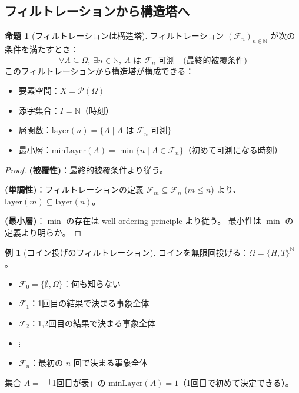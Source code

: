 \documentclass[a4paper,12pt]{ltjsarticle}
\theoremstyle{definition}
\newtheorem{proposition}[definition]{命題}
\newtheorem{example}[definition]{例}
\begin{document}
\subsection{フィルトレーションから構造塔へ}

\begin{proposition}[フィルトレーションは構造塔]\label{prop:filtration-to-tower}
フィルトレーション $(\mathcal{F}_n)_{n \in \mathbb{N}}$ が次の条件を満たすとき：
\[
  \forall A \subseteq \Omega,\ \exists n \in \mathbb{N},\ A \text{ は } \mathcal{F}_n\text{-可測}
  \quad \text{(最終的被覆条件)}
\]
このフィルトレーションから構造塔が構成できる：
\begin{itemize}
  \item 要素空間：$X = \mathcal{P}(\Omega)$
  \item 添字集合：$I = \mathbb{N}$（時刻）
  \item 層関数：$\mathrm{layer}(n) = \{ A \mid A \text{ は } \mathcal{F}_n\text{-可測}\}$
  \item 最小層：$\mathrm{minLayer}(A) = \min\{ n \mid A \in \mathcal{F}_n \}$（初めて可測になる時刻）
\end{itemize}
\end{proposition}

\begin{proof}
\textbf{(被覆性)}：最終的被覆条件より従う。

\textbf{(単調性)}：フィルトレーションの定義 $\mathcal{F}_m \subseteq \mathcal{F}_n$ ($m \leq n$) より、
$\mathrm{layer}(m) \subseteq \mathrm{layer}(n)$。

\textbf{(最小層)}：$\min$ の存在は well-ordering principle より従う。
最小性は $\min$ の定義より明らか。
\end{proof}

\begin{example}[コイン投げのフィルトレーション]
コインを無限回投げる：$\Omega = \{H, T\}^\mathbb{N}$。
\begin{itemize}
  \item $\mathcal{F}_0 = \{\emptyset, \Omega\}$：何も知らない
  \item $\mathcal{F}_1$：1回目の結果で決まる事象全体
  \item $\mathcal{F}_2$：1,2回目の結果で決まる事象全体
  \item $\vdots$
  \item $\mathcal{F}_n$：最初の $n$ 回で決まる事象全体
\end{itemize}

集合 $A = $ 「1回目が表」の $\mathrm{minLayer}(A) = 1$（1回目で初めて決定できる）。
\end{example}
\end{document}
